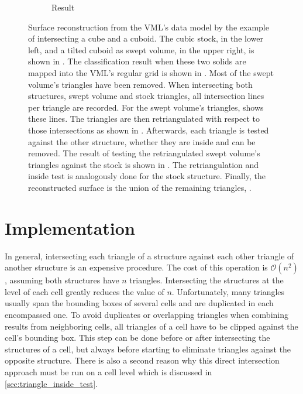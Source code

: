 \begin{figure}
\begin{subfigure}[t]{0.3\textwidth}
		\caption{Result}
		\label{fig:cube2_result}
	\end{subfigure}
	\caption[Direct intersection concept]{
		Surface reconstruction from the VML's data model by the example of intersecting a cube and a cuboid.
		The cubic stock, in the lower left, and a tilted cuboid as swept volume, in the upper right, is shown in .
		The classification result when these two solids are mapped into the VML's regular grid is shown in .
		Most of the swept volume's triangles have been removed.
		When intersecting both structures, \ie swept volume and stock triangles, all intersection lines per triangle are recorded.
		For the swept volume's triangles,  shows these lines.
		The triangles are then retriangulated with respect to those intersections as shown in .
		Afterwards, each triangle is tested against the other structure, whether they are inside and can be removed.
		The result of testing the retriangulated swept volume's triangles against the stock is shown in .
		The retriangulation and inside test is analogously done for the stock structure.
		Finally, the reconstructed surface is the union of the remaining triangles, \cf {}.
	}
	\label{fig:cube2}
\end{figure}


\section{Implementation}
\label{sec:direct_intersection_implementation}

In general, intersecting each triangle of a structure against each other triangle of another structure is an expensive procedure.
The cost of this operation is $\mathcal{O}(n^2)$, assuming both structures have $n$ triangles.
Intersecting the structures at the level of each cell greatly reduces the value of $n$.
Unfortunately, many triangles usually span the bounding boxes of several cells and are duplicated in each encompassed one.
To avoid duplicates or overlapping triangles when combining results from neighboring cells, all triangles of a cell have to be clipped against the cell's bounding box.
This step can be done before or after intersecting the structures of a cell, but always before starting to eliminate triangles against the opposite structure.
There is also a second reason why this direct intersection approach must be run on a cell level which is discussed in \cref{sec:triangle_inside_test}.

